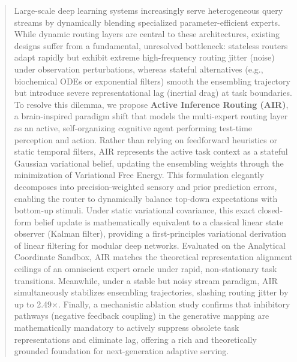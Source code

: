 \begin{abstract}
Large-scale deep learning systems increasingly serve heterogeneous query streams by dynamically blending specialized parameter-efficient experts. While dynamic routing layers are central to these architectures, existing designs suffer from a fundamental, unresolved bottleneck: stateless routers adapt rapidly but exhibit extreme high-frequency routing jitter (noise) under observation perturbations, whereas stateful alternatives (e.g., biochemical ODEs or exponential filters) smooth the ensembling trajectory but introduce severe representational lag (inertial drag) at task boundaries. To resolve this dilemma, we propose \textbf{Active Inference Routing (AIR)}, a brain-inspired paradigm shift that models the multi-expert routing layer as an active, self-organizing cognitive agent performing test-time perception and action. Rather than relying on feedforward heuristics or static temporal filters, AIR represents the active task context as a stateful Gaussian variational belief, updating the ensembling weights through the minimization of Variational Free Energy. This formulation elegantly decomposes into precision-weighted sensory and prior prediction errors, enabling the router to dynamically balance top-down expectations with bottom-up stimuli. Under static variational covariance, this exact closed-form belief update is mathematically equivalent to a classical linear state observer (Kalman filter), providing a first-principles variational derivation of linear filtering for modular deep networks. Evaluated on the Analytical Coordinate Sandbox, AIR matches the theoretical representation alignment ceilings of an omniscient expert oracle under rapid, non-stationary task transitions. Meanwhile, under a stable but noisy stream paradigm, AIR simultaneously stabilizes ensembling trajectories, slashing routing jitter by up to 2.49$\times$. Finally, a mechanistic ablation study confirms that inhibitory pathways (negative feedback coupling) in the generative mapping are mathematically mandatory to actively suppress obsolete task representations and eliminate lag, offering a rich and theoretically grounded foundation for next-generation adaptive serving.
\end{abstract}
